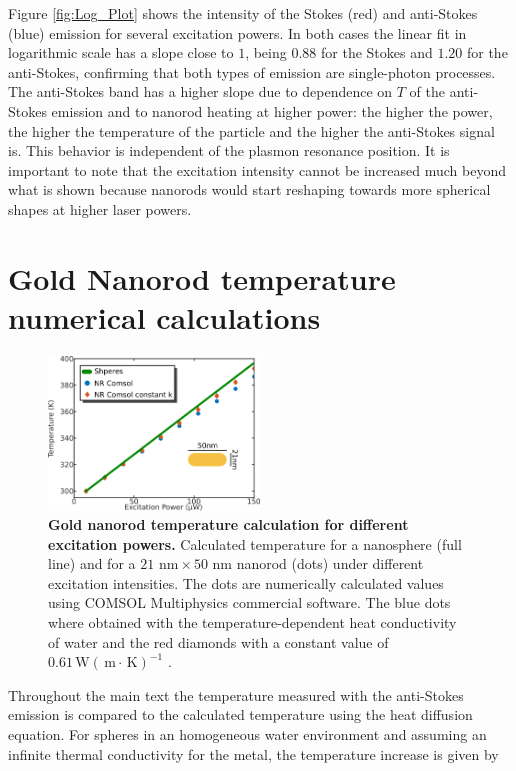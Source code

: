 \documentclass[journal=nalefd,manuscript=letter]{achemso}
\newcommand{\K}{\ensuremath{\,\textrm{K}}}
\newcommand{\nm}{\ensuremath{\,\textrm{nm}}}
\newcommand{\m}{\ensuremath{\,\textrm{m}}}
\newcommand{\W}{\ensuremath{\,\textrm{W}}}
\begin{document}
Figure \ref{fig:Log_Plot} shows the intensity of the Stokes (red) and
anti-Stokes (blue) emission for several excitation powers. In both cases the
linear fit in logarithmic scale has a slope close to $1$, being $0.88$ for the
Stokes and $1.20$ for the anti-Stokes, confirming that both types of emission
are single-photon processes. 
The anti-Stokes band has a higher slope due to dependence on $T$ of the 
anti-Stokes emission and to nanorod heating at higher power:
 the higher the power, the higher the temperature of the particle and the 
higher the anti-Stokes signal is. This behavior is independent of the plasmon
resonance position. It is important to note that the excitation intensity cannot
be increased much beyond what is shown because nanorods would start reshaping
towards more spherical shapes at higher laser powers.



\section{Gold Nanorod temperature numerical calculations} \label{sec:temp-calc}

\begin{figure}[htp] \centering
\includegraphics[width=0.5\textwidth]{Figures/Supplementary/04_Compare_Comsol/04_Compare_Comsol.png}
\caption{\textbf{Gold nanorod temperature calculation for different excitation powers.}
Calculated temperature for a nanosphere (full line) and 
for a $21\,\nm\times 50\,\nm$ nanorod (dots) under different excitation intensities. 
The dots are numerically calculated values using COMSOL Multiphysics commercial software. 
The blue dots where obtained with the temperature-dependent heat conductivity of water 
and the red diamonds with a constant value of $0.61 \W(\m\cdot\K)^{-1}$ .}
	\label{fig:Compare-Comsol}
\end{figure}

Throughout the main text the temperature measured with the anti-Stokes emission
is compared to the calculated temperature using the heat diffusion
equation. For spheres in an homogeneous water environment and assuming an infinite
thermal conductivity for the metal, the temperature increase is given by
\end{document}
